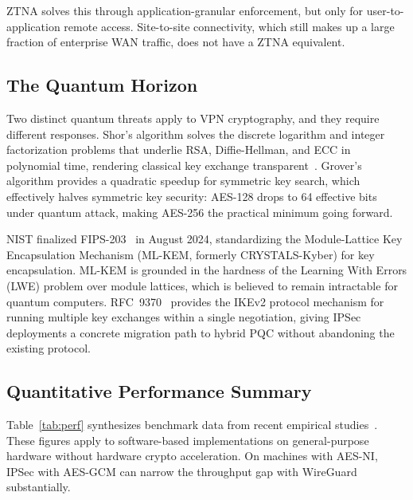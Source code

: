 \documentclass[conference]{IEEEtran}
\begin{document}
ZTNA solves this through application-granular enforcement,
but only for user-to-application remote access. Site-to-site
connectivity, which still makes up a large fraction of
enterprise WAN traffic, does not have a ZTNA equivalent.

\subsection{The Quantum Horizon}

Two distinct quantum threats apply to VPN cryptography, and
they require different responses. Shor's algorithm solves the
discrete logarithm and integer factorization problems that
underlie RSA, Diffie-Hellman, and ECC in polynomial time,
rendering classical key exchange transparent~\cite{nist_fips203}.
Grover's algorithm provides a quadratic speedup for symmetric
key search, which effectively halves symmetric key security:
AES-128 drops to 64 effective bits under quantum attack,
making AES-256 the practical minimum going forward.

NIST finalized FIPS-203~\cite{nist_fips203} in August 2024,
standardizing the Module-Lattice Key Encapsulation Mechanism
(ML-KEM, formerly CRYSTALS-Kyber) for key encapsulation. ML-KEM
is grounded in the hardness of the Learning With Errors (LWE)
problem over module lattices, which is believed to remain
intractable for quantum computers. RFC~9370~\cite{rfc9370}
provides the IKEv2 protocol mechanism for running multiple key
exchanges within a single negotiation, giving IPSec deployments
a concrete migration path to hybrid PQC without abandoning
the existing protocol.

\subsection{Quantitative Performance Summary}

Table~\ref{tab:perf} synthesizes benchmark data from recent
empirical studies~\cite{zhuque2026,zenarmor2023,tahenni2024}.
These figures apply to software-based implementations on
general-purpose hardware without hardware crypto acceleration.
On machines with AES-NI, IPSec with AES-GCM can narrow the
throughput gap with WireGuard substantially.
\end{document}
